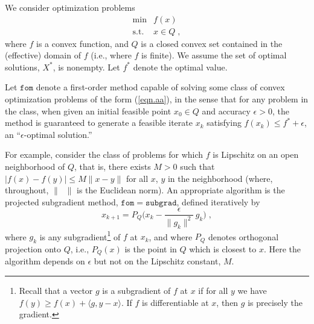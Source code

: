 \documentclass[reqno, 11pt]{amsart}
\numberwithin{equation}{section}
\newcommand{\shrink}[1]{ {\scriptstyle {\textstyle {#1} } } }
\newcommand{\smfrac}[2]{ \shrink{ \frac{#1}{#2} } }
\newcommand{\lin}{\langle}
\newcommand{\rin}{\rangle}
\newcommand{\fom}{\mathtt{fom}}
\newcommand{\subgrad}{\mathtt{subgrad}}
\begin{document}
We consider optimization problems
\begin{equation}  \label{eqn.aa} 
\begin{array}{rl}
\min & f(x) \\
\textrm{s.t.} & x \in Q \; , \end{array} \end{equation}
where $ f $ is a convex function, and $ Q $ is a closed convex set contained in the (effective) domain of $ f $ (i.e., where $ f $ is finite). We assume the set of optimal solutions, $ X^* $, is nonempty. Let $ f^* $ denote the optimal value.

Let $ \fom $ denote a first-order method capable of solving some class of convex optimization problems of the form (\ref{eqn.aa}), in the sense that for any problem in the class, when given an initial feasible point $ x_0 \in Q $ and accuracy $ \epsilon  > 0 $, the method is guaranteed to generate a feasible iterate $ x_k $ satisfying $ f(x_k) \leq f^* + \epsilon $, an ``$ \epsilon $-optimal solution.'' 

For example, consider the class of problems for which $ f $ is Lipschitz on an open neighborhood of $ Q $, that is, there exists $ M > 0 $ such that $ | f(x) - f(y) | \leq M \| x - y \| $ for all $ x $, $ y $ in the neighborhood (where, throughout, $ \| \; \; \| $ is the Euclidean norm). An appropriate algorithm is the projected subgradient method, $ \fom = \subgrad $, defined iteratively by
\begin{equation}  \label{eqn.ab} 
   x_{k+1} = P_Q \big( x_k - \smfrac{\epsilon}{\| g_k \|^2} \, g_k \big) \; , 
   \end{equation} 
where $ g_k $ is any subgradient\footnote{Recall that a vector $ g $ is a subgradient of $ f $ at $ x $ if for all $ y $ we have $ f(y) \geq f(x) + \lin g, y-x \rin $.  If $ f $ is differentiable at $ x $, then $ g $ is precisely the gradient.} of $ f $ at $ x_k $, and where $ P_Q $ denotes orthogonal projection onto $ Q $, i.e., $ P_Q(x) $ is the point in $ Q $ which is closest to $ x $. Here the algorithm depends on $ \epsilon  $ but not on the Lipschitz constant, $ M $.
\end{document}
